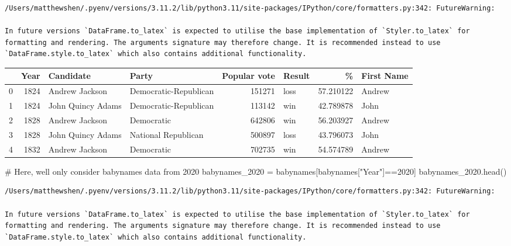 \documentclass[
  letterpaper,
  DIV=11,
  numbers=noendperiod]{scrreprt}
\newenvironment{Shaded}{\begin{snugshade}}{\end{snugshade}}
\newcommand{\CommentTok}[1]{\textcolor[rgb]{0.37,0.37,0.37}{#1}}
\newcommand{\DecValTok}[1]{\textcolor[rgb]{0.68,0.00,0.00}{#1}}
\newcommand{\NormalTok}[1]{\textcolor[rgb]{0.00,0.23,0.31}{#1}}
\newcommand{\OperatorTok}[1]{\textcolor[rgb]{0.37,0.37,0.37}{#1}}
\newcommand{\StringTok}[1]{\textcolor[rgb]{0.13,0.47,0.30}{#1}}
\begin{document}
\begin{verbatim}
/Users/matthewshen/.pyenv/versions/3.11.2/lib/python3.11/site-packages/IPython/core/formatters.py:342: FutureWarning:

In future versions `DataFrame.to_latex` is expected to utilise the base implementation of `Styler.to_latex` for formatting and rendering. The arguments signature may therefore change. It is recommended instead to use `DataFrame.style.to_latex` which also contains additional functionality.
\end{verbatim}

\begin{tabular}{lrllrlrl}
\toprule
{} &  Year &          Candidate &                  Party &  Popular vote & Result &          \% & First Name \\
\midrule
0 &  1824 &     Andrew Jackson &  Democratic-Republican &        151271 &   loss &  57.210122 &     Andrew \\
1 &  1824 &  John Quincy Adams &  Democratic-Republican &        113142 &    win &  42.789878 &       John \\
2 &  1828 &     Andrew Jackson &             Democratic &        642806 &    win &  56.203927 &     Andrew \\
3 &  1828 &  John Quincy Adams &    National Republican &        500897 &   loss &  43.796073 &       John \\
4 &  1832 &     Andrew Jackson &             Democratic &        702735 &    win &  54.574789 &     Andrew \\
\bottomrule
\end{tabular}

\begin{Shaded}
\begin{Highlighting}[]
\CommentTok{\# Here, we\textquotesingle{}ll only consider \textasciigrave{}babynames\textasciigrave{} data from 2020}
\NormalTok{babynames\_2020 }\OperatorTok{=}\NormalTok{ babynames[babynames[}\StringTok{"Year"}\NormalTok{]}\OperatorTok{==}\DecValTok{2020}\NormalTok{]}
\NormalTok{babynames\_2020.head()}
\end{Highlighting}
\end{Shaded}

\begin{verbatim}
/Users/matthewshen/.pyenv/versions/3.11.2/lib/python3.11/site-packages/IPython/core/formatters.py:342: FutureWarning:

In future versions `DataFrame.to_latex` is expected to utilise the base implementation of `Styler.to_latex` for formatting and rendering. The arguments signature may therefore change. It is recommended instead to use `DataFrame.style.to_latex` which also contains additional functionality.
\end{verbatim}
\end{document}
